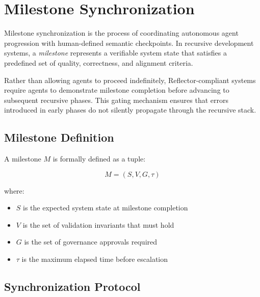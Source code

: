 \section{Milestone Synchronization}
\label{sec:milestone-synchronization}

%

Milestone synchronization is the process of coordinating autonomous agent progression
with human-defined semantic checkpoints. In recursive development systems, a
\textit{milestone} represents a verifiable system state that satisfies a predefined
set of quality, correctness, and alignment criteria.

Rather than allowing agents to proceed indefinitely, Reflector-compliant systems
require agents to demonstrate milestone completion before advancing to subsequent
recursive phases. This gating mechanism ensures that errors introduced in early phases
do not silently propagate through the recursive stack.

\subsection{Milestone Definition}

A milestone $M$ is formally defined as a tuple:

\[
M = (S, V, G, \tau)
\]

where:
\begin{itemize}
  \item $S$ is the expected system state at milestone completion
  \item $V$ is the set of validation invariants that must hold
  \item $G$ is the set of governance approvals required
  \item $\tau$ is the maximum elapsed time before escalation
\end{itemize}

\subsection{Synchronization Protocol}


